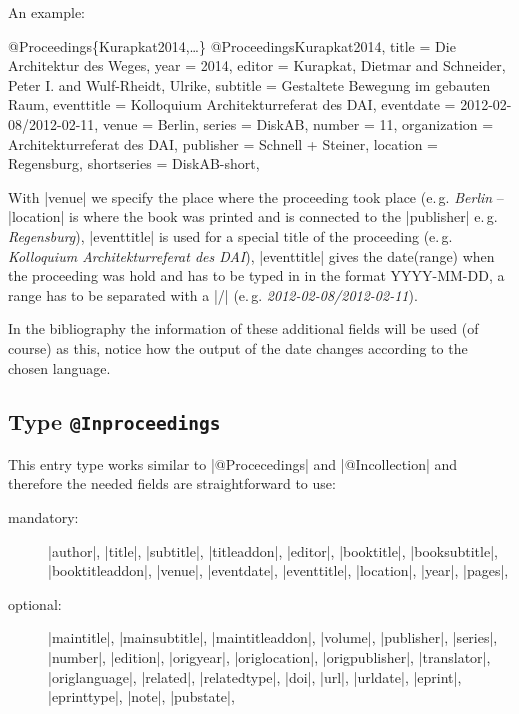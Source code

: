 \documentclass[a4paper,
10pt,
greek,
french,
spanish,
italian,
ngerman,
english,
]{ltxdoc}
\begin{document}
An example:
 \begin{bibexample}[label=Kurapkat2014]{{@}Proceedings\{Kurapkat2014,…\}}
@Proceedings{Kurapkat2014,
  title        = {Die Architektur des Weges},
  year         = {2014},
  editor       = {Kurapkat, Dietmar and Schneider, Peter I. and Wulf-Rheidt, Ulrike},
  subtitle     = {Gestaltete Bewegung im gebauten Raum},
  eventtitle   = {Kolloquium Architekturreferat des DAI},
  eventdate    = {2012-02-08/2012-02-11},
  venue        = Berlin,     %
  series       = DiskAB,    %
  number       = {11},
  organization = {Architekturreferat des DAI},
  publisher    = {Schnell + Steiner},
  location     = Regensburg,     %
  shortseries  = DiskAB-short,    %
}
\end{bibexample}
With |venue| we specify the place where the proceeding took place 
(e.\,g. \emph{Berlin} -- |location| is where the book was printed and is connected 
to the |publisher| e.\,g. \emph{Regensburg}),
|eventtitle| is used for a special title of the proceeding (e.\,g. \emph{Kolloquium Architekturreferat des DAI}),
|eventtitle| gives the date(range) when the proceeding was hold and has to be typed in in the format YYYY-MM-DD, 
a range has to be separated with a |/| (e.\,g.  \emph{2012-02-08/2012-02-11}).

In the bibliography the information of these additional fields will be used (of course) as this, notice how the output of the date changes according to the chosen language.

\subsection{Type \texttt{@Inproceedings}}\label{inproceedings}
This entry type works similar to |@Procecedings| and |@Incollection| and therefore the needed fields are straightforward to use:

\begin{description}
\item[mandatory:] 
|author|, |title|, |subtitle|, |titleaddon|,
|editor|,  |booktitle|, |booksubtitle|, |booktitleaddon|,
|venue|, |eventdate|, |eventtitle|,
|location|, |year|, |pages|, 
\item[optional:]
|maintitle|, |mainsubtitle|, |maintitleaddon|, |volume|, 
|publisher|, |series|, |number|, |edition|, 
|origyear|, |origlocation|, |origpublisher|, 
|translator|, |origlanguage|,
|related|, |relatedtype|,
|doi|, |url|, |urldate|, |eprint|, |eprinttype|, |note|, |pubstate|, 
\end{description}
 
\end{document}
